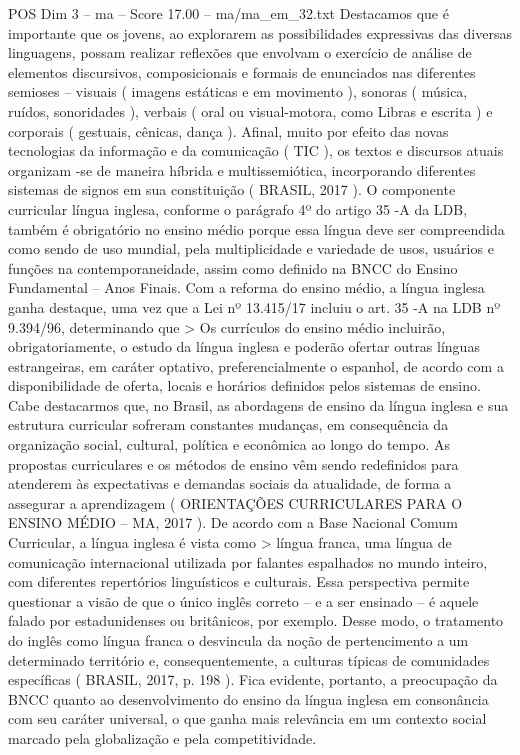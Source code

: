 \begin{textsample}{POS Dim 3 – ma – Score 17.00 – ma/ma\_em\_32.txt}
Destacamos que é importante que os jovens, ao explorarem as possibilidades expressivas das diversas linguagens, possam realizar reflexões que envolvam o exercício de análise de elementos discursivos, composicionais e formais de enunciados nas diferentes semioses – visuais ( imagens estáticas e em movimento ), sonoras ( música, ruídos, sonoridades ), verbais ( oral ou visual-motora, como Libras e escrita ) e corporais ( gestuais, cênicas, dança ).
Afinal, muito por efeito das novas tecnologias da informação e da comunicação ( TIC ), os textos e discursos atuais organizam -se de maneira híbrida e multissemiótica, incorporando diferentes sistemas de signos em sua constituição ( BRASIL, 2017 ).
O componente curricular língua inglesa, conforme o parágrafo 4º do artigo 35 -A da LDB, também é obrigatório no ensino médio porque essa língua deve ser compreendida como sendo de uso mundial, pela multiplicidade e variedade de usos, usuários e funções na contemporaneidade, assim como definido na BNCC do Ensino Fundamental – Anos Finais.
Com a reforma do ensino médio, a língua inglesa ganha destaque, uma vez que a Lei nº 13.415/17 incluiu o art. 35 -A na LDB nº 9.394/96, determinando que > Os currículos do ensino médio incluirão, obrigatoriamente, o estudo da língua inglesa e poderão ofertar outras línguas estrangeiras, em caráter optativo, preferencialmente o espanhol, de acordo com a disponibilidade de oferta, locais e horários definidos pelos sistemas de ensino.
Cabe destacarmos que, no Brasil, as abordagens de ensino da língua inglesa e sua estrutura curricular sofreram constantes mudanças, em consequência da organização social, cultural, política e econômica ao longo do tempo.
As propostas curriculares e os métodos de ensino vêm sendo redefinidos para atenderem às expectativas e demandas sociais da atualidade, de forma a assegurar a aprendizagem ( ORIENTAÇÕES CURRICULARES PARA O ENSINO MÉDIO – MA, 2017 ).
De acordo com a Base Nacional Comum Curricular, a língua inglesa é vista como > língua franca, uma língua de comunicação internacional utilizada por falantes espalhados no mundo inteiro, com diferentes repertórios linguísticos e culturais.
Essa perspectiva permite questionar a visão de que o único inglês correto – e a ser ensinado – é aquele falado por estadunidenses ou britânicos, por exemplo.
Desse modo, o tratamento do inglês como língua franca o desvincula da noção de pertencimento a um determinado território e, consequentemente, a culturas típicas de comunidades específicas ( BRASIL, 2017, p. 198 ).
Fica evidente, portanto, a preocupação da BNCC quanto ao desenvolvimento do ensino da língua inglesa em consonância com seu caráter universal, o que ganha mais relevância em um contexto social marcado pela globalização e pela competitividade.

\end{textsample}
